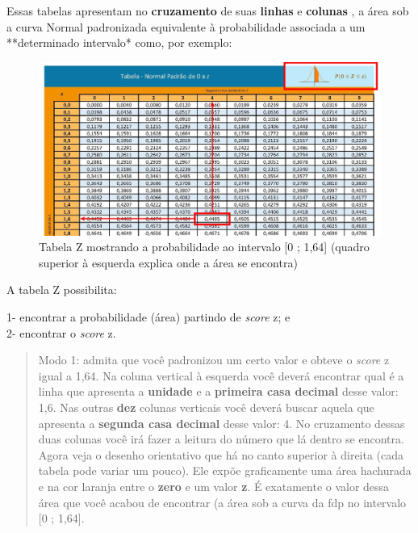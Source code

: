 \documentclass[
]{book}
\begin{document}
\hfill\break

Essas tabelas apresentam no \textbf{cruzamento} de suas \textbf{linhas} e \textbf{colunas} , a área sob a curva Normal padronizada equivalente à probabilidade associada a um **determinado intervalo* como, por exemplo:

\hfill\break

\begin{figure}

{\centering \includegraphics[width=1\linewidth]{images6/tabZa} 

}

\caption{Tabela Z mostrando a probabilidade ao intervalo [0 ; 1,64] (quadro superior à esquerda explica onde a área se encontra)}\label{fig:fig23}
\end{figure}

\hfill\break

A tabela Z possibilita:

\hfill\break

1- encontrar a probabilidade (área) partindo de \emph{score} z; e\\
2- encontrar o \emph{score} z.

\hfill\break

\begin{quote}
Modo 1: admita que você padronizou um certo valor e obteve o \emph{score} z igual a 1,64. Na coluna vertical à esquerda você deverá encontrar qual é a linha que apresenta a \textbf{unidade} e a \textbf{primeira casa decimal} desse valor: 1,6. Nas outras \textbf{dez} colunas verticais você deverá buscar aquela que apresenta a \textbf{segunda casa decimal} desse valor: 4. No cruzamento dessas duas colunas você irá fazer a leitura do número que lá dentro se encontra.
Agora veja o desenho orientativo que há no canto superior à direita (cada tabela pode variar um pouco). Ele expõe graficamente uma área hachurada e na cor laranja entre o \textbf{zero} e um valor \textbf{z}. É exatamente o valor dessa área que você acabou de encontrar (a área sob a curva da fdp no intervalo {[}0 ; 1,64{]}.
\end{quote}
\end{document}

